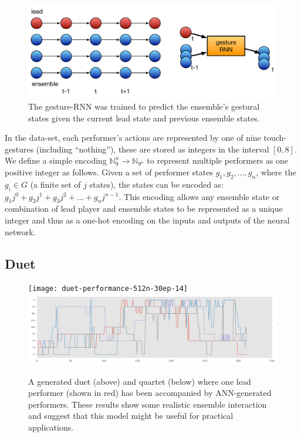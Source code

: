 \documentclass[sigchi]{acmart} %
\begin{document}
\begin{figure}
  \includegraphics[width=\columnwidth]{nn-ensemble-training}
  \caption{The gesture-RNN was trained to predict the ensemble's
    gestural states given the current lead state and previous ensemble
    states.}\label{fig:nn-ensemble-training}
\end{figure}

In the data-set, each performer's actions are represented by one of
nine touch-gestures (including ``nothing''), these are stored as
integers in the interval $[0,8]$. We define a simple encoding
$\mathbb{N}_{9}^n \rightarrow \mathbb{N}_{9^n}$ to represent multiple
performers as one positive integer as follows. Given a set of
performer states $g_1, g_2, \ldots, g_n$, where the $g_i \in G$ (a
finite set of $j$ states), the states can be encoded as:
$ g_1j^0 + g_2j^1 + g_3j^2 + \ldots + g_nj^{n-1} $.
This encoding allows any ensemble state or combination of lead player
and ensemble states to be represented as a unique integer and thus as
a one-hot encoding on the inputs and outputs of the neural network.

\subsection{Duet}

\begin{figure}
  \centering
  \texttt{[image: duet-performance-512n-30ep-14]}
  \includegraphics[width=\columnwidth]{quartet-performance-512nodes-16}
  \caption{A generated duet (above) and quartet (below) where one lead
    performer (shown in red) has been accompanied by ANN-generated
    performers. These results
    show some realistic ensemble interaction and suggest that this
    model might be useful for practical
    applications.}\label{fig:model-examples}
\end{figure}
\end{document}
